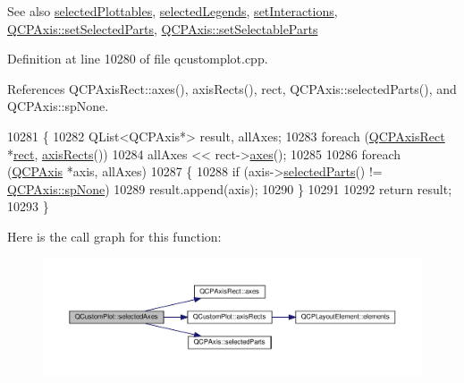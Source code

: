 \begin{DoxySeeAlso}{See also}
\hyperlink{class_q_custom_plot_a6721b8c689bb7f2f400987e580508fe8}{selected\+Plottables}, \hyperlink{class_q_custom_plot_a1ea6297300c3e2770e65f95836411755}{selected\+Legends}, \hyperlink{class_q_custom_plot_a5ee1e2f6ae27419deca53e75907c27e5}{set\+Interactions}, \hyperlink{class_q_c_p_axis_ab9d7a69277dcbed9119b3c1f25ca19c3}{Q\+C\+P\+Axis\+::set\+Selected\+Parts}, \hyperlink{class_q_c_p_axis_a513f9b9e326c505d9bec54880031b085}{Q\+C\+P\+Axis\+::set\+Selectable\+Parts} 
\end{DoxySeeAlso}


Definition at line 10280 of file qcustomplot.\+cpp.



References Q\+C\+P\+Axis\+Rect\+::axes(), axis\+Rects(), rect, Q\+C\+P\+Axis\+::selected\+Parts(), and Q\+C\+P\+Axis\+::sp\+None.


\begin{DoxyCode}
10281 \{
10282   QList<QCPAxis*> result, allAxes;
10283   \textcolor{keywordflow}{foreach} (\hyperlink{class_q_c_p_axis_rect}{QCPAxisRect} *\hyperlink{_gen_blob_8m_aea8f6815d9a63491fc422c5572c6b3c3}{rect}, \hyperlink{class_q_custom_plot_afd67094aaeccbc5719761348b2d8c891}{axisRects}())
10284     allAxes << rect->\hyperlink{class_q_c_p_axis_rect_a66654d51ca611ef036ded36250cd2518}{axes}();
10285   
10286   \textcolor{keywordflow}{foreach} (\hyperlink{class_q_c_p_axis}{QCPAxis} *axis, allAxes)
10287   \{
10288     \textcolor{keywordflow}{if} (axis->\hyperlink{class_q_c_p_axis_a08323248a1cba4750ef07ceea159e0b3}{selectedParts}() != \hyperlink{class_q_c_p_axis_abee4c7a54c468b1385dfce2c898b115fae0df8123a5528d5ccf87cb7794f971ea}{QCPAxis::spNone})
10289       result.append(axis);
10290   \}
10291   
10292   \textcolor{keywordflow}{return} result;
10293 \}
\end{DoxyCode}


Here is the call graph for this function\+:\nopagebreak
\begin{figure}[H]
\begin{center}
\leavevmode
\includegraphics[width=350pt]{class_q_custom_plot_aa6baf867e8beb96ed5bd471f83ece903_cgraph}
\end{center}
\end{figure}


